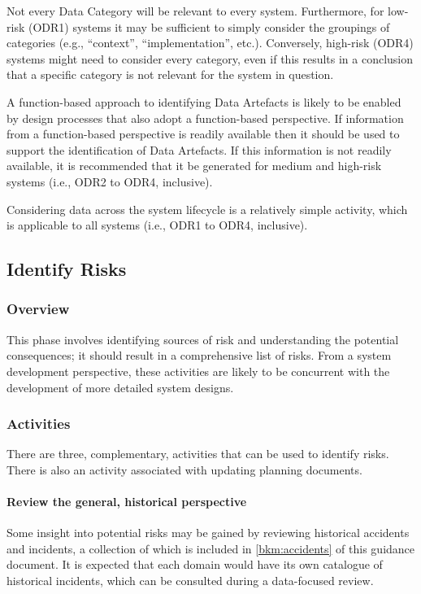 Not every Data Category will be relevant to every system. Furthermore, for low-risk (ODR1) systems it may be sufficient to simply consider the groupings of categories (e.g., ``context'', ``implementation'', etc.). Conversely, high-risk (ODR4) systems might need to consider every category, even if this results in a conclusion that a specific category is not relevant for the system in question.

A function-based approach to identifying Data Artefacts is likely to be enabled by design processes that also adopt a function-based perspective. If \gls{information} from a function-based perspective is readily available then it should be used to support the identification of Data Artefacts. If this \gls{information} is not readily available, it is recommended that it be generated for medium and high-risk systems (i.e., ODR2 to ODR4, inclusive).

Considering data across the system lifecycle is a relatively simple activity, which is applicable to all systems (i.e., ODR1 to ODR4, inclusive).

\subsection{Identify Risks}
\subsubsection{Overview}
This phase involves identifying sources of risk and understanding the potential consequences; it should result in a comprehensive list of risks. From a system development perspective, these activities are likely to be concurrent with the development of more detailed system designs.

\subsubsection{Activities}
There are three, complementary, activities that can be used to identify risks. There is also an activity associated with updating planning documents.

\paragraph{Review the general, historical perspective}
Some insight into potential risks may be gained by reviewing historical accidents and incidents, a collection of which is included in
\autoref{bkm:accidents} of this guidance document. It is expected that each domain would have its own catalogue of historical incidents, which can be consulted during a data-focused review.

